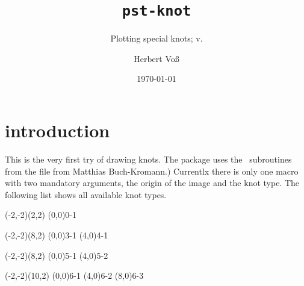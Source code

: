\documentclass[11pt,english,BCOR10mm,DIV12,bibliography=totoc,parskip=false,
   smallheadings, headexclude,footexclude,oneside]{pst-doc}
\let\pstKnotFV\fileversion
\begin{document}
\title{\texttt{pst-knot}}
\subtitle{Plotting special knots; v.\pstKnotFV}
\author{Herbert Vo\ss}
\docauthor{}
\date{\today}
\maketitle

\tableofcontents

\section{introduction}
This is the very first try of drawing knots. The package uses the \PS\ 
subroutines from the file  from Matthias Buch-Kromann.)
Currentlx there is only one macro with two mandatory arguments, the origin
of the image and the knot type. The following list shows all available knot types.

\begin{BDef}
\OptArgs\Largr{\CAny}
\end{BDef}


\begin{LTXexample}
\begin{pspicture}[showgrid=true](-2,-2)(2,2) 
  \psKnot[linewidth=3pt,linecolor=red](0,0){0-1}
\end{pspicture}
\end{LTXexample}

\begin{LTXexample}[pos=t]
\begin{pspicture}[showgrid=true](-2,-2)(8,2) 
  \psKnot[linewidth=3pt,linecolor=red](0,0){3-1}
  \psKnot[linewidth=3pt,linecolor=blue](4,0){4-1}
\end{pspicture}
\end{LTXexample}

\begin{LTXexample}[pos=t]
\begin{pspicture}(-2,-2)(8,2) 
  \psKnot[linewidth=3pt,linecolor=blue](0,0){5-1}
  \psKnot[linewidth=3pt,linecolor=blue](4,0){5-2}
\end{pspicture}
\end{LTXexample}

\begin{LTXexample}[pos=t]
\begin{pspicture}(-2,-2)(10,2) 
  \psKnot[linewidth=3pt,linecolor=blue](0,0){6-1}
  \psKnot[linewidth=3pt,linecolor=blue](4,0){6-2}
  \psKnot[linewidth=3pt,linecolor=blue](8,0){6-3}
\end{pspicture}
\end{LTXexample}
\end{document}
